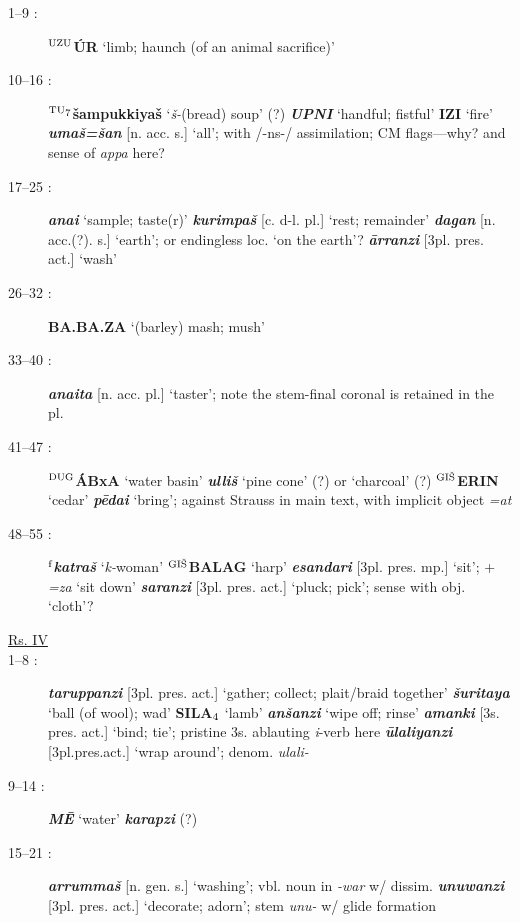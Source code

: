 \documentclass[10pt]{article}
\newcommand{\supersc}[1]{$^{\textrm{\scriptsize{#1}}}$}  	%
\newcommand{\subsc}[1]{$_{\textrm{\scriptsize{#1}}}$}	%
\newcommand{\bit}[1]{\textbf{\textit{#1}}}				%
\newcommand{\p}[1]{{\tiny[{#1}]}}					%
\newcommand{\hith}{\textsubwedge{h}}
\newcommand{\wood}{\supersc{GI\v{S}}}
\newcommand{\vessel}{\supersc{DUG}}
\renewcommand{\.}[1]{\textsubdot{#1}}
\begin{document}
\begin{description}
\item[1--9 :] \textbf{\supersc{UZU}\'UR} `limb; haunch (of an animal sacrifice)'

\item[10--16 :] \textbf{\supersc{TU\subsc{7}}\v{s}ampukkiya\v{s}} `\textit{\v{s}-}(bread) soup' (?) \bit{UPNI} `handful; fistful' \textbf{IZI} `fire' \bit{{\hith}uma\v{s}=\v{s}an} \p{n. acc. s.} `all'; with /-ns-/ assimilation; CM flags---why? and sense of \textit{appa} here?

\item[17--25 :] \bit{ana{\hith}i} `sample; taste(r)' \bit{kurimpa\v{s}} \p{c. d-l. pl.} `rest; remainder' \bit{dagan} \p{n. acc.(?). s.} `earth'; or endingless loc. `on the earth'? \bit{\=arranzi} \p{3pl. pres. act.} `wash'

\item[26--32 :] \textbf{BA.BA.ZA} `(barley) mash; mush'

\item[33--40 :] \bit{ana{\hith}ita} \p{n. acc. pl.} `taster'; note the stem-final coronal is retained in the pl.

\item[41--47 :] \textbf{{\vessel}\'ABxA} `water basin' \bit{{\hith}ulli\v{s}} `pine cone' (?) or `charcoal' (?) \textbf{{\wood}ERIN} `cedar' \bit{p\=edai} `bring'; against Strauss in main text, with implicit object \textit{=at}

\item[48--55 :] \textbf{\supersc{f}}\bit{katra\v{s}} `\textit{k-}woman' \textbf{{\wood}BALAG} `harp' \bit{esandari} \p{3pl. pres. mp.} `sit'; + \textit{=za} `sit down' \bit{saranzi} \p{3pl. pres. act.} `pluck; pick'; sense with obj. `cloth'?

\bigskip
\item[\underline{Rs. IV}]
\bigskip

\item[1--8 :] \bit{taruppanzi} \p{3pl. pres. act.} `gather; collect; plait/braid together' \bit{\v{s}uritaya} `ball (of wool); wad' \textbf{SILA\subsc{4}} `lamb' \bit{an\v{s}anzi} `wipe off; rinse' \bit{{\hith}amanki} \p{3s. pres. act.} `bind; tie'; pristine 3s. ablauting \textit{{\hith}i}-verb here \bit{{\hith}\=ulaliyanzi} \p{3pl.pres.act.} `wrap around'; denom. \textit{{\hith}ulali-} 

\item[9--14 :] \bit{M\=E} `water' \bit{karapzi} (?) 

\item[15--21 :] \bit{arrumma\v{s}} \p{n. gen. s.} `washing'; vbl. noun in \textit{-war} w/ dissim. \bit{unuwanzi} \p{3pl. pres. act.} `decorate; adorn'; stem \textit{unu-} w/ glide formation 


\end{description}
\end{document}
